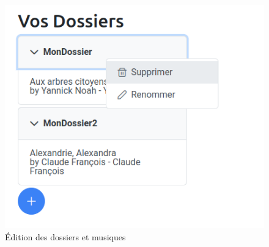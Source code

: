 \documentclass[12pt,french]{article}
\begin{document}
\begin{figure}[H]
\begin{minipage}{.3\textwidth}
	\includegraphics[scale=0.4]{dossier5.png}
\end{minipage}
	\caption{Édition des dossiers et musiques}    
\end{figure}
\end{document}

